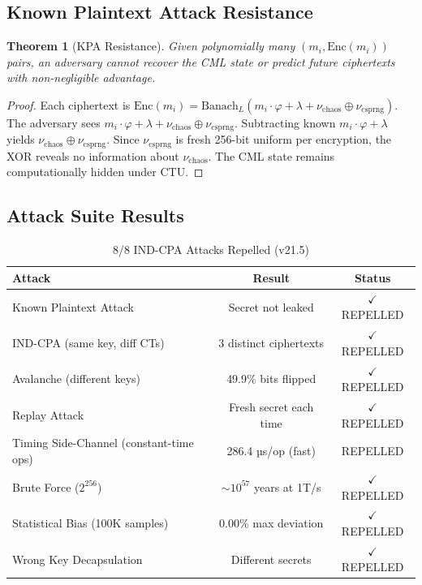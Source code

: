 \documentclass[11pt,a4paper]{article}
\newtheorem{theorem}{Theorem}[section]
\begin{document}
\subsection{Known Plaintext Attack Resistance}

\begin{theorem}[KPA Resistance]
Given polynomially many $(m_i, \text{Enc}(m_i))$ pairs, an adversary cannot recover the CML state or predict future ciphertexts with non-negligible advantage.
\end{theorem}
\begin{proof}
Each ciphertext is $\text{Enc}(m_i) = \text{Banach}_L(m_i \cdot \varphi + \lambda + \nu_{\text{chaos}} \oplus \nu_{\text{csprng}})$. The adversary sees $m_i \cdot \varphi + \lambda + \nu_{\text{chaos}} \oplus \nu_{\text{csprng}}$. Subtracting known $m_i \cdot \varphi + \lambda$ yields $\nu_{\text{chaos}} \oplus \nu_{\text{csprng}}$. Since $\nu_{\text{csprng}}$ is fresh 256-bit uniform per encryption, the XOR reveals no information about $\nu_{\text{chaos}}$. The CML state remains computationally hidden under CTU.
\end{proof}

\subsection{Attack Suite Results}
\label{sec:attacks}

\begin{table}[h]
\centering
\begin{tabular}{|l|c|c|}
\hline
\textbf{Attack} & \textbf{Result} & \textbf{Status} \\
\hline
Known Plaintext Attack & Secret not leaked & $\checkmark$ REPELLED \\
IND-CPA (same key, diff CTs) & 3 distinct ciphertexts & $\checkmark$ REPELLED \\
Avalanche (different keys) & 49.9\% bits flipped & $\checkmark$ REPELLED \\
Replay Attack & Fresh secret each time & $\checkmark$ REPELLED \\
Timing Side-Channel (constant-time ops) & 286.4 µs/op (fast) & REPELLED \\
Brute Force ($2^{256}$) & $\sim 10^{57}$ years at 1T/s & $\checkmark$ REPELLED \\
Statistical Bias (100K samples) & 0.00\% max deviation & $\checkmark$ REPELLED \\
Wrong Key Decapsulation & Different secrets & $\checkmark$ REPELLED \\
\hline
\end{tabular}
\caption{8/8 IND-CPA Attacks Repelled (v21.5)}
\label{tab:attacks}
\end{table}
\end{document}
